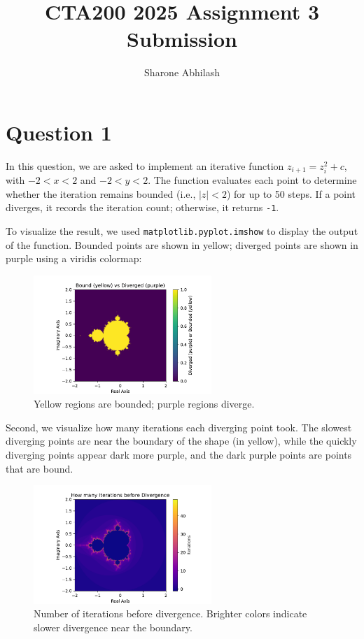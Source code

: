 \documentclass{article}
\title{CTA200 2025 Assignment 3 Submission}
\author{Sharone Abhilash}
\begin{document}
\maketitle

\section*{Question 1}

In this question, we are asked to implement an iterative function \( z_{i+1} = z_i^2 + c \), with $-2 < x < 2$ and $-2 < y < 2$. 
The function evaluates each point to determine whether the iteration remains bounded (i.e., \( |z| < 2 \)) for up to 50 steps. 
If a point diverges, it records the iteration count; otherwise, it returns \texttt{-1}.

To visualize the result, we used \texttt{matplotlib.pyplot.imshow} to display the output of the function. 
Bounded points are shown in yellow; diverged points are shown in purple using a viridis colormap:

\begin{figure}[H]
    \centering
    \includegraphics[width=0.6\textwidth]{question1fig1.pdf}
    \caption{Yellow regions are bounded; purple regions diverge.}
    \label{fig:q1_binary}
\end{figure}

Second, we visualize how many iterations each diverging point took. 
The slowest diverging points are near the boundary of the shape (in yellow), while the quickly diverging points appear dark more purple, and the dark purple points are points that are bound. 

\begin{figure}[H]
    \centering
    \includegraphics[width=0.6\textwidth]{question1fig2.pdf}
    \caption{Number of iterations before divergence. Brighter colors indicate slower divergence near the boundary.}
    \label{fig:q1_colored}
\end{figure}
\end{document}

